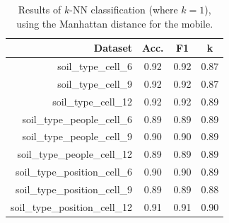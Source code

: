 \documentclass[10pt,conference]{IEEEtran}
\begin{document}
\begin{table}[!ht]
	\centering
	\caption{Results of $k$-NN classification (where $k=1$), using the Manhattan distance for the mobile.}
	\label{tab:cell_knn}
	\scalebox{0.75}
	{
		\begin{tabular}{rccc}
			\toprule
			    \textbf{Dataset}
			    & \textbf{Acc.}
			    & \textbf{F1}
			    & \textbf{k} \\
			\midrule
                soil\_type\_cell\_6            & 0.92 & 0.92 & 0.87 \\
                soil\_type\_cell\_9            & 0.92 & 0.92 & 0.87 \\
                soil\_type\_cell\_12           & 0.92 & 0.92 & 0.89 \\
                soil\_type\_people\_cell\_6    & 0.89 & 0.89 & 0.89 \\
                soil\_type\_people\_cell\_9    & 0.90 & 0.90 & 0.89 \\
                soil\_type\_people\_cell\_12   & 0.89 & 0.89 & 0.89 \\
                soil\_type\_position\_cell\_6  & 0.90 & 0.90 & 0.89 \\
                soil\_type\_position\_cell\_9  & 0.89 & 0.89 & 0.88 \\
                soil\_type\_position\_cell\_12 & 0.91 & 0.91 & 0.90 \\
			\bottomrule
		\end{tabular}
	}
\end{table}

\end{document}
